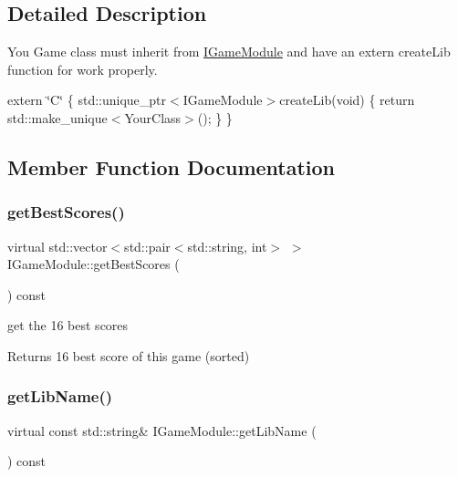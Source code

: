 \subsection{Detailed Description}
You Game class must inherit from \hyperlink{class_i_game_module}{I\+Game\+Module} and have an extern create\+Lib function for work properly. 

extern \char`\"{}\+C\char`\"{} \{ std\+::unique\+\_\+ptr$<$\+I\+Game\+Module$>$create\+Lib(void) \{ return std\+::make\+\_\+unique$<$\+Your\+Class$>$(); \} \} 

\subsection{Member Function Documentation}
\mbox{\label{class_i_game_module_ac83b190c55b2557d06bbec22746c2c17}} 
\subsubsection{\texorpdfstring{get\+Best\+Scores()}{getBestScores()}}
{\footnotesize\ttfamily virtual std\+::vector$<$std\+::pair$<$std\+::string, int$>$ $>$ I\+Game\+Module\+::get\+Best\+Scores (\begin{DoxyParamCaption}{ }\end{DoxyParamCaption}) const\hspace{0.3cm}{\ttfamily [pure virtual]}}



get the 16 best scores 

\begin{DoxyReturn}{Returns}
16 best score of this game (sorted) 
\end{DoxyReturn}
\mbox{\label{class_i_game_module_aef6b69aca908bbbc77e52b729afd1ced}} 
\subsubsection{\texorpdfstring{get\+Lib\+Name()}{getLibName()}}
{\footnotesize\ttfamily virtual const std\+::string\& I\+Game\+Module\+::get\+Lib\+Name (\begin{DoxyParamCaption}{ }\end{DoxyParamCaption}) const\hspace{0.3cm}{\ttfamily [pure virtual]}}



